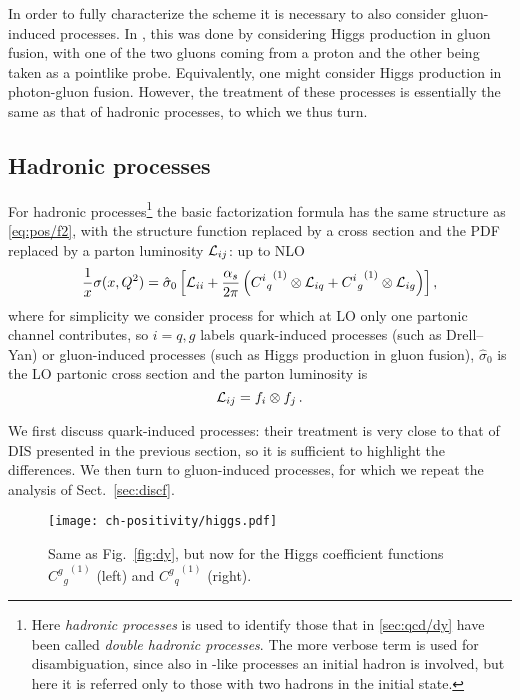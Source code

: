 In order to fully characterize the scheme it is necessary to also consider
gluon-induced processes. 
In \cite{Altarelli:1998gn}, this was done by considering Higgs production in
gluon fusion, with one of the two gluons coming from a proton and the other
being taken as a pointlike probe.
Equivalently, one might consider Higgs production in photon-gluon fusion.
However, the treatment of these processes is essentially the same as that of
hadronic processes, to which we thus turn.


\subsection{Hadronic processes}
\label{sec:hadr}
For hadronic processes\footnote{
  Here \textit{hadronic processes} is used to identify those that in
  \cref{sec:qcd/dy} have been called \textit{double hadronic processes}.
  The more verbose term is used for disambiguation, since also in \dis-like
  processes an initial hadron is involved, but here it is referred only to
  those with two hadrons in the initial state.
} the basic factorization formula has the same structure
as \cref{eq:pos/f2}, with the structure function replaced by a cross section
and the PDF replaced by a parton luminosity ${\cal L}_{ij}$: up to NLO
\begin{equation}
 \frac{1}{x} \sigma(x,Q^2)= \hat \sigma_0 \left[  {\cal L}_{ii}
   +\frac{\alpha_s}{2\pi}\left( {{C^i}_q}^{(1)} \otimes {\cal L}_{iq} +
 {{C^i}_g}^{(1)} \otimes {\cal L}_{ig}\right) \right],\label{eq:pos/hadfact}
\end{equation}
where for simplicity we consider process for which at LO only one
partonic channel contributes, so
$i=q,g$ labels quark-induced processes (such as Drell--Yan) or
gluon-induced processes (such as Higgs production in gluon fusion),
$\hat{\sigma}_0$ is the LO partonic cross section and
the parton luminosity is 
\begin{equation}\label{eq:pos/lumi}
 {\cal L}_{ij}= f_i\otimes f_j\,.
\end{equation}

We first discuss quark-induced processes: their treatment is very close to that
of DIS  presented in the previous section, so it is sufficient to highlight the
differences.
We then turn to gluon-induced processes, for which we repeat the analysis of
Sect.~\ref{sec:discf}.


\begin{figure}[t]
  \begin{center}
    \texttt{[image: ch-positivity/higgs.pdf]}
    \caption{\small Same as Fig.~\ref{fig:dy}, but now for the Higgs
      coefficient functions  ${{{C^g}_g}^{(1)}}$ (left) and
      ${{{C^g}_q}^{(1)}}$ (right).
    \label{fig:higgs} }
  \end{center}
\end{figure}


